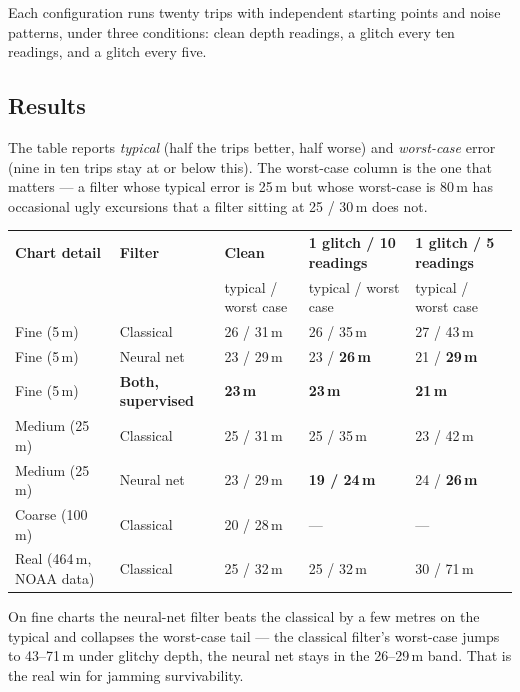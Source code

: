 \documentclass[10pt,a4paper]{article}
\begin{document}
Each configuration runs twenty trips with independent starting points
and noise patterns, under three conditions: clean depth readings,
a glitch every ten readings, and a glitch every five.

\subsection{Results}

The table reports \emph{typical} (half the trips better, half worse)
and \emph{worst-case} error (nine in ten trips stay at or below this).
The worst-case column is the one that matters --- a filter whose typical
error is 25\,m but whose worst-case is 80\,m has occasional ugly
excursions that a filter sitting at 25 / 30\,m does not.

\begin{tabularx}{\textwidth}{@{}l l l l l@{}}
\toprule
\textbf{Chart detail} & \textbf{Filter} & \textbf{Clean} & \textbf{1 glitch / 10 readings} & \textbf{1 glitch / 5 readings} \\
& & typical / worst case & typical / worst case & typical / worst case \\
\midrule
\rowcolor{mRow} Fine (5\,m)   & Classical    & 26 / 31\,m & 26 / 35\,m & 27 / 43\,m \\
Fine (5\,m)                    & Neural net   & 23 / 29\,m & 23 / \textbf{26\,m} & 21 / \textbf{29\,m} \\
\rowcolor{mRow} Fine (5\,m)   & \textbf{Both, supervised} & \textbf{23\,m} & \textbf{23\,m} & \textbf{21\,m} \\
Medium (25\,m)                 & Classical    & 25 / 31\,m & 25 / 35\,m & 23 / 42\,m \\
\rowcolor{mRow} Medium (25\,m) & Neural net  & 23 / 29\,m & \textbf{19 / 24\,m} & 24 / \textbf{26\,m} \\
Coarse (100\,m)                & Classical    & 20 / 28\,m & --- & --- \\
\rowcolor{mRow} Real (464\,m, NOAA data) & Classical & 25 / 32\,m & 25 / 32\,m & 30 / 71\,m \\
\bottomrule
\end{tabularx}

On fine charts the neural-net filter beats the classical by a few
metres on the typical and collapses the worst-case tail --- the
classical filter's worst-case jumps to 43--71\,m under glitchy depth,
the neural net stays in the 26--29\,m band. That is the real win for
jamming survivability.
\end{document}
